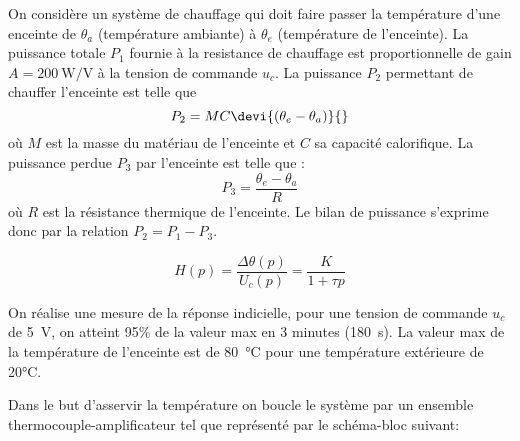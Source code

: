 On considère un système de chauffage qui doit faire passer la température 
d'une enceinte de $\theta_a$  (température ambiante) à $\theta_e$ (température 
de l'enceinte). 
La puissance totale $P_1$ fournie à la resistance de chauffage 
est proportionnelle de gain $A=\SI{200}{\watt\per\volt}$ à la tension de 
commande $u_c$. 
La puissance $P_2$ permettant de chauffer l'enceinte est telle que 
\[
    P_2=MC\devi{(\theta_e-\theta_a)}{}
\]
où $M$ est la masse du matériau de l'enceinte et $C$ sa capacité calorifique.
La puissance perdue $P_3$ par l'enceinte est telle que :
\[
    P_3=\dfrac{\theta_e-\theta_a}{R}
\]
où $R$ est la résistance thermique de l'enceinte.
Le bilan de puissance s'exprime donc par la relation $P_2=P_1-P_3$.


\[
    H(p)=\dfrac{\Delta\theta(p)}{U_c(p)}=\dfrac{K}{1+\tau p}
\]

On réalise une mesure de la réponse indicielle, pour une tension de commande 
$u_c$ de \SI{5}{\volt}, on atteint 95\% de la valeur max en 3 minutes 
(\SI{180}{\second}). La valeur max de la température de l'enceinte est de 
\SI{80}{\celsius} pour une température extérieure de 20°C.

Dans le but d'asservir la température on boucle le système par un ensemble 
thermocouple-amplificateur tel que représenté par le schéma-bloc suivant:

